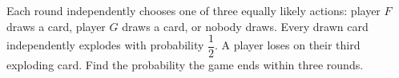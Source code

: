 Each round independently chooses one of three equally likely actions: player $F$ draws a card, player $G$ draws a card, or nobody draws. Every drawn card independently explodes with probability $\dfrac{1}{2}$. A player loses on their third exploding card. Find the probability the game ends within three rounds.
